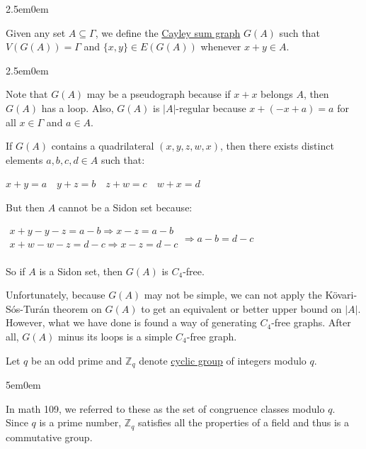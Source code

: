 \documentclass{book}
\newcommand{\hTwo}{%
   \color{MidnightBlue}%
   \fontsize{13}{15}\selectfont%
}
\newcommand{\hThree}{%
   \color{PineGreen}
   \fontsize{13}{15}\selectfont%
}
\newcommand{\myComment}{%
   \color{RawerSienna}%
   \fontsize{12}{14}\selectfont%
}
\newenvironment{myIndent}{%
   \begin{adjustwidth}{2.5em}{0em}%
}{%
   \end{adjustwidth}%
}
\newenvironment{myDindent}{%
   \begin{adjustwidth}{5em}{0em}%
}{%
   \end{adjustwidth}%
}
\newcommand{\udefine}[1]{{%
   \setulcolor{Red}%
   \setul{0.14em}{0.07em}%
   \ul{#1}%
}}
\newcommand{\retTwo}{\hfill\bigbreak}
\begin{document}
{\begin{myIndent} \hTwo
   Given any set $A \subseteq \Gamma$, we define the \udefine{Cayley sum graph} $G(A)$ such that $V(G(A)) = \Gamma$ and $\{x, y\} \in E(G(A))$ whenever $x + y \in A$.
   
   {\begin{myIndent} \hThree
      Note that $G(A)$ may be a pseudograph because if $x + x$ belongs $A$, then $G(A)$ has a loop. Also, $G(A)$ is $|A|$-regular because $x + (-x + a) = a$ for all $x \in \Gamma$ and $a \in A$. \retTwo
      
      If $G(A)$ contains a quadrilateral $(x, y, z, w, x)$, then there exists distinct\\ elements $a, b, c, d \in A$ such that:
      
      {\center $ x + y = a \quad y + z = b \quad z + w = c \quad w + x = d $ \retTwo\par}
   
      But then $A$ cannot be a Sidon set because:
      
      {\center$
      \begin{matrix}
         x + y - y - z = a - b \Longrightarrow x - z = a - b \\
         x + w - w - z = d - c \Longrightarrow x - z = d - c \\
      \end{matrix} \Longrightarrow a - b = d - c$ \retTwo\par}
   
      So if $A$ is a Sidon set, then $G(A)$ is $C_4$-free. \retTwo

      Unfortunately, because $G(A)$ may not be simple, we can not apply the Kövari-Sós-Turán theorem on $G(A)$ to get an equivalent or better upper bound on $|A|$. However, what we have done is found a way of generating $C_4$-free graphs. After all, $G(A)$ minus its loops is a simple $C_4$-free graph.
   \end{myIndent}}
\end{myIndent}}

\newpage

Let $q$ be an odd prime and $\mathbb{Z}_q$ denote \udefine{cyclic group} of integers modulo $q$.
{\begin{myDindent} \myComment
   In math 109, we referred to these as the set of congruence classes modulo $q$. \\ Since $q$ is a prime number, $\mathbb{Z}_q$ satisfies all the properties of a field and thus is a commutative group. \retTwo
\end{myDindent}}
\end{document}
